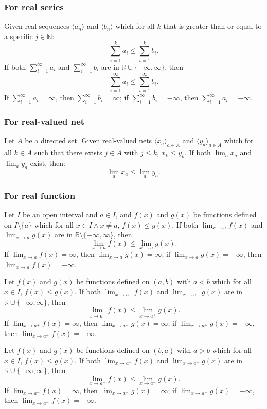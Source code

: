 \documentclass[a4paper,12pt]{report}
\begin{document}
\begin{itemize}
\begin{itemize}
\subsubsection{For real series}
Given real sequences $\langle a_n\rangle$ and $\langle b_n\rangle$ which for all $k$ that is greater than or equal to a specific $j\in \mathbb{N}$:
\[\sum_{i=1}^ka_i\leq\sum_{i=1}^kb_i.\]
If both $\sum_{i=1}^{\infty}a_i$ and $\sum_{i=1}^{\infty}b_i$ are in $\mathbb{R}\cup\{-\infty,\infty\}$, then
\[\sum_{i=1}^{\infty}a_i\leq\sum_{i=1}^{\infty}b_i.\]
If $\sum_{i=1}^{\infty}a_i=\infty$, then $\sum_{i=1}^{\infty}b_i=\infty$; if $\sum_{i=1}^{\infty}b_i=-\infty$, then $\sum_{i=1}^{\infty}a_i=-\infty$.
\subsubsection{For real-valued net}
Let $A$ be a directed set. Given real-valued nets $\langle x_a\rangle_{a\in A}$ and $\langle y_a\rangle_{a\in A}$ which for all $k\in A$ such that there exists $j\in A$ with $j\leq k$, $x_k\leq y_k$. If both $\lim_{a}x_a$ and $\lim_{a}y_a$ exist, then:
\[\lim_{a}x_a\leq\lim_{a}y_a.\]
\subsubsection{For real function}
Let $I$ be an open interval and $a\in I$, and $f(x)$ and $g(x)$ be functions defined on $I\setminus\{a\}$ which for all $x\in I\land x\neq a$, $f(x)\leq g(x)$. If both $\lim_{x\to a}f(x)$ and $\lim_{x\to a}g(x)$ are in $\mathbb{R}\setminus\{-\infty,\infty\}$, then
\[\lim_{x\to a}f(x)\leq\lim_{x\to a}g(x).\]
If $\lim_{x\to a}f(x)=\infty$, then $\lim_{x\to a}g(x)=\infty$; if $\lim_{x\to a}g(x)=-\infty$, then $\lim_{x\to a}f(x)=-\infty$.

Let $f(x)$ and $g(x)$ be functions defined on $(a,b)$ with $a<b$ which for all $x\in I$, $f(x)\leq g(x)$. If both $\lim_{x\to a^+}f(x)$ and $\lim_{x\to a^+}g(x)$ are in $\mathbb{R}\cup\{-\infty,\infty\}$, then
\[\lim_{x\to a^+}f(x)\leq\lim_{x\to a^+}g(x).\]
If $\lim_{x\to a^+}f(x)=\infty$, then $\lim_{x\to a^+}g(x)=\infty$; if $\lim_{x\to a^+}g(x)=-\infty$, then $\lim_{x\to a^+}f(x)=-\infty$.

Let $f(x)$ and $g(x)$ be functions defined on $(b,a)$ with $a>b$ which for all $x\in I$, $f(x)\leq g(x)$. If both $\lim_{x\to a^-}f(x)$ and $\lim_{x\to a^-}g(x)$ are in $\mathbb{R}\cup\{-\infty,\infty\}$, then
\[\lim_{x\to a^-}f(x)\leq\lim_{x\to a^-}g(x).\]
If $\lim_{x\to a^-}f(x)=\infty$, then $\lim_{x\to a^-}g(x)=\infty$; if $\lim_{x\to a^-}g(x)=-\infty$, then $\lim_{x\to a^-}f(x)=-\infty$.


\end{itemize}
\end{itemize}
\end{document}
